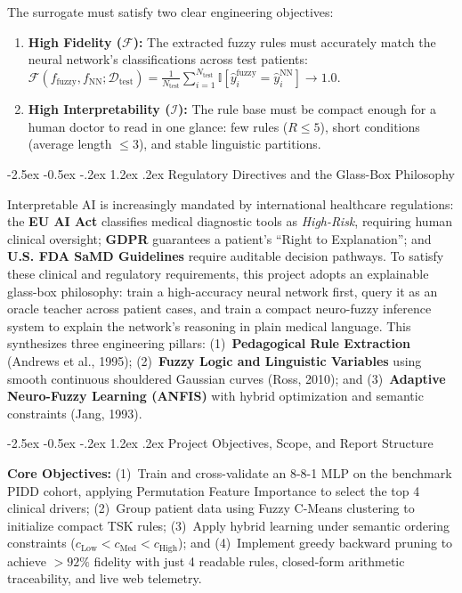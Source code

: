 \documentclass[12pt,a4paper,oneside]{report}
\makeatletter
\renewcommand\section{\@startsection {section}{1}{\z@}%
                                   {-2.5ex \@plus -0.5ex \@minus -.2ex}%
                                   {1.2ex \@plus .2ex}%
                                   {\normalfont\fontsize{13}{16}\selectfont\bfseries}}
\makeatother
\begin{document}
The surrogate must satisfy two clear engineering objectives:
\begin{enumerate}
    \setlength{\itemsep}{0pt}
    \setlength{\parskip}{0pt}
    \item \textbf{High Fidelity ($\mathcal{F}$):} The extracted fuzzy rules must accurately match the neural network's classifications across test patients: $\mathcal{F}(f_{\text{fuzzy}}, f_{\text{NN}}; \mathcal{D}_{\text{test}}) = \frac{1}{N_{\text{test}}} \sum_{i=1}^{N_{\text{test}}} \mathbb{I}[ \hat{y}^{\text{fuzzy}}_i = \hat{y}^{\text{NN}}_i ] \to 1.0$.
    \item \textbf{High Interpretability ($\mathcal{I}$):} The rule base must be compact enough for a human doctor to read in one glance: few rules ($R \le 5$), short conditions (average length $\le 3$), and stable linguistic partitions.
\end{enumerate}

\section{Regulatory Directives and the Glass-Box Philosophy}

Interpretable AI is increasingly mandated by international healthcare regulations: the \textbf{EU AI Act} classifies medical diagnostic tools as \textit{High-Risk}, requiring human clinical oversight; \textbf{GDPR} guarantees a patient's ``Right to Explanation''; and \textbf{U.S. FDA SaMD Guidelines} require auditable decision pathways. To satisfy these clinical and regulatory requirements, this project adopts an explainable glass-box philosophy: train a high-accuracy neural network first, query it as an oracle teacher across patient cases, and train a compact neuro-fuzzy inference system to explain the network's reasoning in plain medical language. This synthesizes three engineering pillars: (1)~\textbf{Pedagogical Rule Extraction} (Andrews et al., 1995); (2)~\textbf{Fuzzy Logic and Linguistic Variables} using smooth continuous shouldered Gaussian curves (Ross, 2010); and (3)~\textbf{Adaptive Neuro-Fuzzy Learning (ANFIS)} with hybrid optimization and semantic constraints (Jang, 1993).

\section{Project Objectives, Scope, and Report Structure}

\textbf{Core Objectives:} (1)~Train and cross-validate an 8-8-1 MLP on the benchmark PIDD cohort, applying Permutation Feature Importance to select the top 4 clinical drivers; (2)~Group patient data using Fuzzy C-Means clustering to initialize compact TSK rules; (3)~Apply hybrid learning under semantic ordering constraints ($c_{\text{Low}} < c_{\text{Med}} < c_{\text{High}}$); and (4)~Implement greedy backward pruning to achieve $>92\%$ fidelity with just 4 readable rules, closed-form arithmetic traceability, and live web telemetry.
\end{document}
